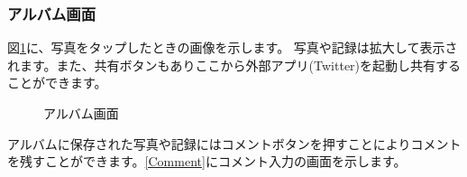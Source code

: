 \documentclass[a4j]{jarticle}
\begin{document}
\subsubsection{アルバム画面}\label{albam}
図\ref{Albam}に、写真をタップしたときの画像を示します。
写真や記録は拡大して表示されます。また、共有ボタンもありここから外部アプリ(Twitter)を起動し共有することができます。

\begin{figure}[H]
    \begin{center}
    \caption {アルバム画面}
    \label{Albam}
    \end{center}
\end{figure}

アルバムに保存された写真や記録にはコメントボタンを押すことによりコメントを残すことができます。\ref{Comment}にコメント入力の画面を示します。
\end{document}
